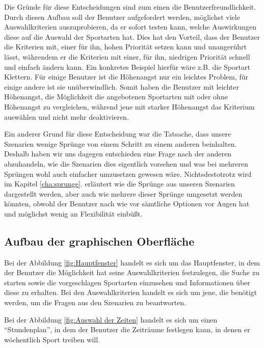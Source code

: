 Die Gr\"unde f\"ur diese Entscheidungen sind zum einen die Benutzerfreundlichkeit. Durch diesen Aufbau soll der Benutzer aufgefordert werden, m\"oglichst viele Auswahlkriterien auszuprobieren, da er sofort testen kann, welche Auswirkungen diese auf die Auswahl der Sportarten hat. Dies hat den Vorteil, dass der Benutzer die Kriterien mit, einer f\"ur ihn, hohen Priorit\"at setzen kann und unanger\"uhrt l\"asst, w\"ahrendem er die Kriterien mit einer, f\"ur ihn, niedrigen Priorit\"at schnell und einfach \"andern kann. Ein konkretes Beispiel hierf\"ur w\"are z.B. die Sportart Klettern. F\"ur einige Benutzer ist die H\"ohenangst nur ein leichtes Problem, f\"ur einige andere ist sie un\"uberwindlich. Somit haben die Benutzer mit leichter H\"ohenangst, die M\"oglichkeit die angebotenen Sportarten mit oder ohne H\"ohenangst zu vergleichen, w\"ahrend jene mit starker H\"ohenangst das Kriterium ausw\"ahlen und nicht mehr deaktivieren.

Ein anderer Grund f\"ur diese Entscheidung war die Tatsache, dass unsere Szenarien wenige Spr\"unge von einem Schritt zu einem anderen beinhalten. Deshalb haben wir uns dagegen entschieden eine Frage nach der anderen abzuhandeln, wie die Szenarien dies eigentlich vorsehen und was bei mehreren Spr\"ungen wohl auch einfacher umzusetzen gewesen w\"are. Nichtsdestotrotz wird im Kapitel \ref{cha:sprunge}.  erl\"autert wie die Spr\"unge aus unseren Szenarien dargestellt werden, aber auch wie mehrere dieser Spr\"unge umgesetzt werden k\"onnten, obwohl der Benutzer nach wie vor s\"amtliche Optionen vor Augen hat und m\"oglichst wenig an Flexibilit\"at einb\"ußt.

\subsection{Aufbau der graphischen Oberfl\"ache}

Bei der Abbildung \ref{fig:Hauptfenster} handelt es sich um das Hauptfenster, in dem der Benutzer die M\"oglichkeit hat seine Auswahlkriterien festzulegen, die Suche zu starten sowie die vorgeschlagen Sportarten einzusehen und Informationen \"uber diese zu erhalten. Bei den Auswahlkriterien handelt es sich um jene, die ben\"otigt werden, um die Fragen aus den Szenarien zu beantworten.

Bei der Abbildung \ref{fig:Auswahl der Zeiten} handelt es sich um einen "`Stundenplan"', in dem der Benutzer die Zeitr\"aume festlegen kann, in denen er w\"ochentlich Sport treiben will. 

